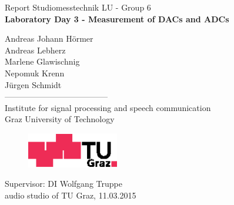 \documentclass[11pt]{report}
\begin{document}
\begin{titlepage}
\begin{center}
  \vspace*{0.5cm}
  {\LARGE Report Studiomesstechnik LU - Group 6} \\
  \vspace{15mm}
  {\huge \bf Laboratory Day 3 - Measurement of DACs and ADCs \\}

  \vspace{15mm}
  {\LARGE Andreas Johann H\"ormer} \\
{\small }Andreas Lebherz\\
Marlene Glawischnig\\
Nepomuk Krenn\\
J\"urgen Schmidt\\ %
  \vspace{10mm}%
  -------------------------------------- \\
  \vspace{10mm}%
  \large
  Institute for signal processing and speech communication \\
  Graz University of Technology \\


  \vspace{15mm}%
  \begin{figure}[!ht]
  \begin{center}
  \centerline{\includegraphics[width=4cm,keepaspectratio=true]{TULogoneu}}
  \end{center}
  \end{figure}
  \vspace{10mm}
Supervisor: DI Wolfgang Truppe \\
  \vfill
  audio studio of TU Graz, 11.03.2015
  \vspace{0.5cm}
\end{center}
\end{titlepage}
\end{document}
